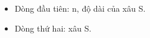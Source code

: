 \begin{itemize}
	\item     Dòng đầu tiên: n, độ dài của xâu S.   
	\item     Dòng thứ hai: xâu S.   
\end{itemize}